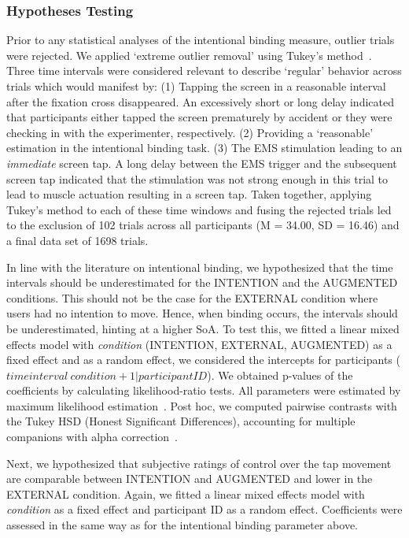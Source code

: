 \subsubsection{Hypotheses Testing}
Prior to any statistical analyses of the intentional binding measure, outlier trials were rejected. We applied `extreme outlier removal' using Tukey's method~\cite{Tukey1949-sl}. Three time intervals were considered relevant to describe `regular' behavior across trials which would manifest by: (1) Tapping the screen in a reasonable interval after the fixation cross disappeared. An excessively short or long delay indicated that participants either tapped the screen prematurely by accident or they were checking in with the experimenter, respectively. (2) Providing a `reasonable' estimation in the intentional binding task. (3) The EMS stimulation leading to an \textit{immediate} screen tap. A long delay between the EMS trigger and the subsequent screen tap indicated that the stimulation was not strong enough in this trial to lead to muscle actuation resulting in a screen tap. Taken together, applying Tukey's method to each of these time windows and fusing the rejected trials led to the exclusion of 102 trials across all participants (M = 34.00, SD = 16.46) and a final data set of 1698 trials.

In line with the literature on intentional binding, we hypothesized that the time intervals should be underestimated for the INTENTION and the AUGMENTED conditions. This should not be the case for the EXTERNAL condition where users had no intention to move. Hence, when binding occurs, the intervals should be underestimated, hinting at a higher SoA. To test this, we fitted a linear mixed effects model with \textit{condition} (INTENTION, EXTERNAL, AUGMENTED) as a fixed effect and as a random effect, we considered the intercepts for participants ($time interval ~ condition + 1|participantID$). We obtained p-values of the coefficients by calculating likelihood-ratio tests. All parameters were estimated by maximum likelihood estimation~\cite{Pinheiro2006-bk}. Post hoc, we computed pairwise contrasts with the Tukey HSD (Honest Significant Differences), accounting for multiple companions with alpha correction~\cite{Lenth2020-xk}.


Next, we hypothesized that subjective ratings of control over the tap movement are comparable between INTENTION and AUGMENTED and lower in the EXTERNAL condition. Again, we fitted a linear mixed effects model with \textit{condition} as a fixed effect and participant ID as a random effect. Coefficients were assessed in the same way as for the intentional binding parameter above.

